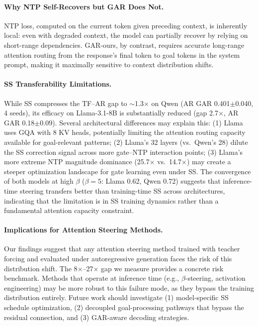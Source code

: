 \documentclass[11pt,a4paper]{article}
\begin{document}
\paragraph{Why NTP Self-Recovers but GAR Does Not.}
NTP loss, computed on the current token given preceding context, is inherently local: even with degraded context, the model can partially recover by relying on short-range dependencies. GAR-ours, by contrast, requires accurate long-range attention routing from the response's final token to goal tokens in the system prompt, making it maximally sensitive to context distribution shifts.

\paragraph{SS Transferability Limitations.}
While SS compresses the TF--AR gap to $\sim$1.3$\times$ on Qwen (AR GAR 0.401$\pm$0.040, 4 seeds), its efficacy on Llama-3.1-8B is substantially reduced (gap 2.7$\times$, AR GAR 0.18$\pm$0.09). Several architectural differences may explain this: (1) Llama uses GQA with 8 KV heads, potentially limiting the attention routing capacity available for goal-relevant patterns; (2) Llama's 32 layers (vs.\ Qwen's 28) dilute the SS correction signal across more gate--NTP interaction points; (3) Llama's more extreme NTP magnitude dominance (25.7$\times$ vs.\ 14.7$\times$) may create a steeper optimization landscape for gate learning even under SS. The convergence of both models at high $\beta$ ($\beta{=}5$: Llama 0.62, Qwen 0.72) suggests that inference-time steering transfers better than training-time SS across architectures, indicating that the limitation is in SS training dynamics rather than a fundamental attention capacity constraint.

\paragraph{Implications for Attention Steering Methods.}
Our findings suggest that any attention steering method trained with teacher forcing and evaluated under autoregressive generation faces the risk of this distribution shift. The 8$\times$--27$\times$ gap we measure provides a concrete risk benchmark. Methods that operate at inference time (e.g., $\beta$-steering, activation engineering) may be more robust to this failure mode, as they bypass the training distribution entirely. Future work should investigate (1) model-specific SS schedule optimization, (2) decoupled goal-processing pathways that bypass the residual connection, and (3) GAR-aware decoding strategies.
\end{document}
